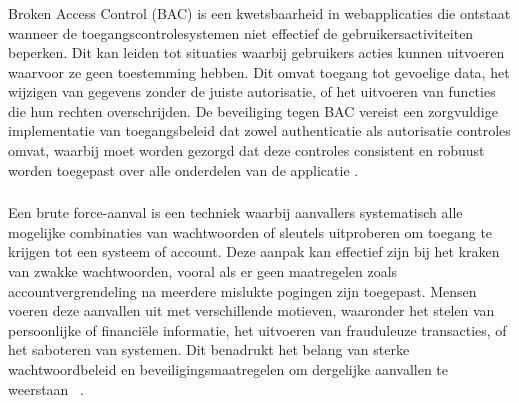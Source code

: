 \subsubsection{}
\label{sec:Broken Access Control (BAC)}

Broken Access Control (BAC) is een kwetsbaarheid in webapplicaties die ontstaat wanneer de toegangscontrolesystemen niet effectief de gebruikersactiviteiten beperken. 
Dit kan leiden tot situaties waarbij gebruikers acties kunnen uitvoeren waarvoor ze geen toestemming hebben. Dit omvat toegang tot gevoelige data, het wijzigen 
van gegevens zonder de juiste autorisatie, of het uitvoeren van functies die hun rechten overschrijden. De beveiliging tegen BAC vereist een zorgvuldige implementatie 
van toegangsbeleid dat zowel authenticatie als autorisatie controles omvat, waarbij moet worden gezorgd dat deze controles consistent en robuust worden toegepast over 
alle onderdelen van de applicatie \autocite{Anas2024}.

\subsubsection{}
\label{sec:brute force aanvallen}
Een brute force-aanval is een techniek waarbij aanvallers systematisch alle mogelijke combinaties van wachtwoorden of sleutels uitproberen om toegang te krijgen tot een 
systeem of account. Deze aanpak kan effectief zijn bij het kraken van zwakke wachtwoorden, vooral als er geen maatregelen zoals accountvergrendeling na meerdere mislukte 
pogingen zijn toegepast. Mensen voeren deze aanvallen uit met verschillende motieven, waaronder het stelen van persoonlijke of financiële informatie, het uitvoeren van 
frauduleuze transacties, of het saboteren van systemen. Dit benadrukt het belang van sterke wachtwoordbeleid en beveiligingsmaatregelen om dergelijke aanvallen te weerstaan
~\autocite{Djukanovic2020}.

